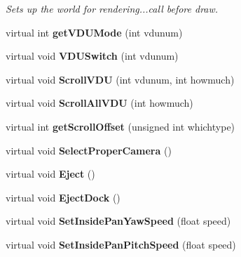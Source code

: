 \begin{DoxyCompactItemize}
\begin{DoxyCompactList}\small\item\em Sets up the world for rendering...call before draw. \end{DoxyCompactList}\item 
virtual int {\bfseries get\+V\+D\+U\+Mode} (int vdunum)\hypertarget{classCockpit_a4582c82ce8c098feba16659302cc2e02}{}\label{classCockpit_a4582c82ce8c098feba16659302cc2e02}

\item 
virtual void {\bfseries V\+D\+U\+Switch} (int vdunum)\hypertarget{classCockpit_ae6bf08abe0b07a21f4026829616dacff}{}\label{classCockpit_ae6bf08abe0b07a21f4026829616dacff}

\item 
virtual void {\bfseries Scroll\+V\+DU} (int vdunum, int howmuch)\hypertarget{classCockpit_a3e2c6dc09b4b4b8cec2216827f4b34bb}{}\label{classCockpit_a3e2c6dc09b4b4b8cec2216827f4b34bb}

\item 
virtual void {\bfseries Scroll\+All\+V\+DU} (int howmuch)\hypertarget{classCockpit_abc45680bca86f20ee8a386de0386197f}{}\label{classCockpit_abc45680bca86f20ee8a386de0386197f}

\item 
virtual int {\bfseries get\+Scroll\+Offset} (unsigned int whichtype)\hypertarget{classCockpit_a0d329e032adc5515341a7350abd85484}{}\label{classCockpit_a0d329e032adc5515341a7350abd85484}

\item 
virtual void {\bfseries Select\+Proper\+Camera} ()\hypertarget{classCockpit_a64c05ddd1eabe3f2b3ea879be8491161}{}\label{classCockpit_a64c05ddd1eabe3f2b3ea879be8491161}

\item 
virtual void {\bfseries Eject} ()\hypertarget{classCockpit_ab8a3343d97a26e8131c1c03242172d92}{}\label{classCockpit_ab8a3343d97a26e8131c1c03242172d92}

\item 
virtual void {\bfseries Eject\+Dock} ()\hypertarget{classCockpit_aa7e89db9adef5e2364e918305ec09353}{}\label{classCockpit_aa7e89db9adef5e2364e918305ec09353}

\item 
virtual void {\bfseries Set\+Inside\+Pan\+Yaw\+Speed} (float speed)\hypertarget{classCockpit_a4c55bfac6a710651f8798dbd935da4f6}{}\label{classCockpit_a4c55bfac6a710651f8798dbd935da4f6}

\item 
virtual void {\bfseries Set\+Inside\+Pan\+Pitch\+Speed} (float speed)\hypertarget{classCockpit_a57a8425a9a8814119bd13cc20e24d5e1}{}\label{classCockpit_a57a8425a9a8814119bd13cc20e24d5e1}


\end{DoxyCompactItemize}
